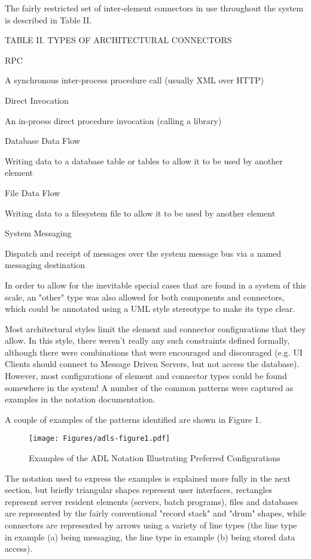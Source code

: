 \begin{itemise}
  The fairly restricted set of inter-element connectors in use throughout the system is described in Table II.

TABLE II.  TYPES OF ARCHITECTURAL CONNECTORS

RPC

A synchronous inter-process procedure call (usually XML over HTTP)

Direct Invocation

An in-proess direct procedure invocation (calling a library)

Database Data Flow

Writing data to a database table or tables to allow it to be used by another element

File Data Flow

Writing data to a filesystem file to allow it to be used by another element

System Messaging

Dispatch and receipt of messages over the system message bus via a named messaging destination

  In order to allow for the inevitable special cases that are found in a system of this scale, an "other" type was also allowed for both components and connectors, which could be annotated using a UML style stereotype to make its type clear.

  Most architectural styles limit the element and connector configurations that they allow.  In this style, there weren't really any such constraints defined formally, although there were combinations that were encouraged and discouraged (e.g. UI Clients should connect to Message Driven Servers, but not access the database).  However, most configurations of element and connector types could be found somewhere in the system! A number of the common patterns were captured as examples in the notation documentation.

  A couple of examples of the patterns identified are shown in Figure 1. 

  
\begin{figure}[h!]
\centering
\texttt{[image: Figures/adls-figure1.pdf]}
\caption{Examples of the ADL Notation Illustrating Preferred Configurations}
\end{figure}
  

  The notation used to express the examples is explained more fully in the next section, but briefly triangular shapes represent user interfaces, rectangles represent server resident elements (servers, batch programs), files and databases are represented by the fairly conventional "record stack" and "drum" shapes, while connectors are represented by arrows using a variety of line types (the line type in example (a) being messaging, the line type in example (b) being stored data access).


\end{itemise}
